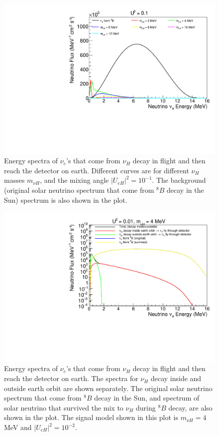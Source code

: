 \documentclass[%
 reprint,
 amsmath,amssymb,
 aps,
 prd,
floatfix,
twocolumn,
]{revtex4-1}
\begin{document}
\begin{figure}[!htbp]
\includegraphics[width=0.99\columnwidth]{../plots/DecayInFlightNuLEnergy_U0.1_AllMass_linXlinY.pdf}
\caption{Energy spectra of $\nu_e$'s that come from $\nu_H$ decay in flight and then reach the detector on earth. Different curves are for different $\nu_H$ masses $m_{\nu H}$, and the mixing angle $|U_{eH}|^2 = 10^{-1}$. 
The background (original solar neutrino spectrum that come from $^8 B$ decay in the Sun) spectrum is also shown in the plot.}
\label{fig:DecayInFlightSpectrum_U1em1_AllMass}
\end{figure}

\begin{figure}[!htbp]
\includegraphics[width=0.99\columnwidth]{../plots/DecayInFlightNuLEnergy_U0.01_M4.0_InsideOutside_linXlogY.pdf}
\caption{Energy spectra of $\nu_e$'s that come from $\nu_H$ decay in flight and then reach the detector on earth. The spectra for $\nu_H$ decay inside and outside earth orbit are shown separately. 
The original solar neutrino spectrum that come from $^8 B$ decay in the Sun, and spectrum of solar neutrino that survived the mix to $\nu_H$ during $^{8}B$ decay, are also shown in the plot. The signal model shown in this plot is $m_{\nu H} = 4$ MeV and $|U_{eH}|^2 = 10^{-2}$.}
\label{fig:DecayInFlightSpectrum_U1em2_M4} 
\end{figure}
\end{document}
